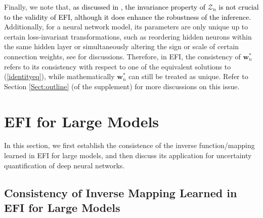 \documentclass[11pt]{article}
\newcommand{\bX}{{\boldsymbol X}}
\newcommand{\bY}{{\boldsymbol Y}}
\newcommand{\bZ}{{\boldsymbol Z}}
\newcommand{\bw}{{\boldsymbol w}}
\newcommand{\btheta}{{\boldsymbol \theta}}
\begin{document}
Finally, we note that, \textcolor{black}{as discussed in \cite{LiangKS2024EFI}, the invariance property of $\mathcal{Z}_n$ is not crucial to the validity of EFI, although it does enhance the robustness of the inference.}
Additionally, for a neural network model, its parameters are only unique up to certain loss-invariant transformations, such as reordering hidden neurons within the same hidden layer or simultaneously altering the sign or scale of certain connection weights, see \cite{SunSLiang2021} for discussions. 
Therefore, in EFI, the consistency of $\bw_n^*$ refers to its consistency with respect to one of the equivalent 
solutions to (\ref{identityeq}), 
while mathematically $\bw_n^*$
can still be treated as unique. Refer to Section \ref{Sect:outline} (of the supplement) for more discussions on this issue.  




 

\section{EFI for Large Models} \label{sect:EFI-large}

In this section, we first establish the consistence of the inverse function/mapping learned in EFI for large models, and then discuss its application for uncertainty quantification of deep neural networks. 

\subsection{Consistency of Inverse Mapping Learned in EFI for Large Models}
\end{document}
